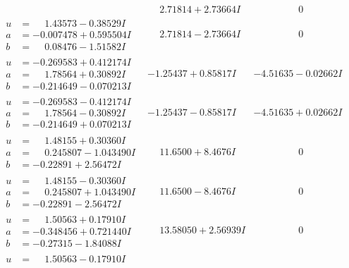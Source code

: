 \documentclass[1p]{elsarticle_modified}
\theoremstyle{definition}
\begin{document}
$$\begin{array}{c|c|c}
 & \phantom{-}2.71814 + 2.73664 I & \phantom{-0.000000 } 0 \\ \hline\begin{aligned}
u &= \phantom{-}1.43573 - 0.38529 I \\
a &= -0.007478 + 0.595504 I \\
b &= \phantom{-}0.08476 - 1.51582 I\end{aligned}
 & \phantom{-}2.71814 - 2.73664 I & \phantom{-0.000000 } 0 \\ \hline\begin{aligned}
u &= -0.269583 + 0.412174 I \\
a &= \phantom{-}1.78564 + 0.30892 I \\
b &= -0.214649 - 0.070213 I\end{aligned}
 & -1.25437 + 0.85817 I & -4.51635 - 0.02662 I \\ \hline\begin{aligned}
u &= -0.269583 - 0.412174 I \\
a &= \phantom{-}1.78564 - 0.30892 I \\
b &= -0.214649 + 0.070213 I\end{aligned}
 & -1.25437 - 0.85817 I & -4.51635 + 0.02662 I \\ \hline\begin{aligned}
u &= \phantom{-}1.48155 + 0.30360 I \\
a &= \phantom{-}0.245807 - 1.043490 I \\
b &= -0.22891 + 2.56472 I\end{aligned}
 & \phantom{-}11.6500 + 8.4676 I & \phantom{-0.000000 } 0 \\ \hline\begin{aligned}
u &= \phantom{-}1.48155 - 0.30360 I \\
a &= \phantom{-}0.245807 + 1.043490 I \\
b &= -0.22891 - 2.56472 I\end{aligned}
 & \phantom{-}11.6500 - 8.4676 I & \phantom{-0.000000 } 0 \\ \hline\begin{aligned}
u &= \phantom{-}1.50563 + 0.17910 I \\
a &= -0.348456 + 0.721440 I \\
b &= -0.27315 - 1.84088 I\end{aligned}
 & \phantom{-}13.58050 + 2.56939 I & \phantom{-0.000000 } 0 \\ \hline\begin{aligned}
u &= \phantom{-}1.50563 - 0.17910 I \\

\end{aligned}
\end{array}$$
\end{document}
